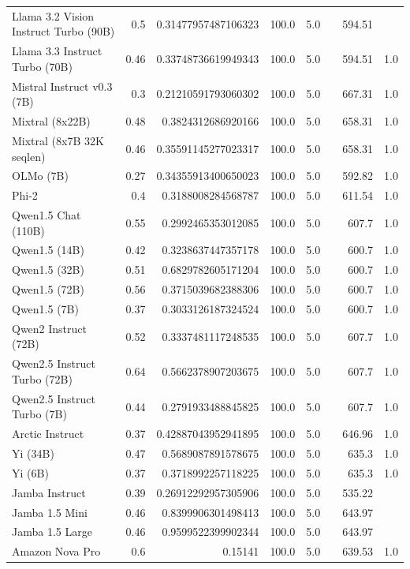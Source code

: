 \begin{table}[htp]
{\begin{tabular}{lrrrrrrr}
Llama 3.2 Vision Instruct Turbo (90B) & 0.5 & 0.31477957487106323 & 100.0 & 5.0 &  & 594.51 &  \\
Llama 3.3 Instruct Turbo (70B) & 0.46 & 0.33748736619949343 & 100.0 & 5.0 &  & 594.51 & 1.0 \\
Mistral Instruct v0.3 (7B) & 0.3 & 0.21210591793060302 & 100.0 & 5.0 &  & 667.31 & 1.0 \\
Mixtral (8x22B) & 0.48 & 0.3824312686920166 & 100.0 & 5.0 &  & 658.31 & 1.0 \\
Mixtral (8x7B 32K seqlen) & 0.46 & 0.35591145277023317 & 100.0 & 5.0 &  & 658.31 & 1.0 \\
OLMo (7B) & 0.27 & 0.34355913400650023 & 100.0 & 5.0 &  & 592.82 & 1.0 \\
Phi-2 & 0.4 & 0.3188008284568787 & 100.0 & 5.0 &  & 611.54 & 1.0 \\
Qwen1.5 Chat (110B) & 0.55 & 0.2992465353012085 & 100.0 & 5.0 &  & 607.7 & 1.0 \\
Qwen1.5 (14B) & 0.42 & 0.3238637447357178 & 100.0 & 5.0 &  & 600.7 & 1.0 \\
Qwen1.5 (32B) & 0.51 & 0.6829782605171204 & 100.0 & 5.0 &  & 600.7 & 1.0 \\
Qwen1.5 (72B) & 0.56 & 0.3715039682388306 & 100.0 & 5.0 &  & 600.7 & 1.0 \\
Qwen1.5 (7B) & 0.37 & 0.3033126187324524 & 100.0 & 5.0 &  & 600.7 & 1.0 \\
Qwen2 Instruct (72B) & 0.52 & 0.3337481117248535 & 100.0 & 5.0 &  & 607.7 & 1.0 \\
Qwen2.5 Instruct Turbo (72B) & 0.64 & 0.5662378907203675 & 100.0 & 5.0 &  & 607.7 & 1.0 \\
Qwen2.5 Instruct Turbo (7B) & 0.44 & 0.2791933488845825 & 100.0 & 5.0 &  & 607.7 & 1.0 \\
Arctic Instruct & 0.37 & 0.42887043952941895 & 100.0 & 5.0 &  & 646.96 & 1.0 \\
Yi (34B) & 0.47 & 0.5689087891578675 & 100.0 & 5.0 &  & 635.3 & 1.0 \\
Yi (6B) & 0.37 & 0.3718992257118225 & 100.0 & 5.0 &  & 635.3 & 1.0 \\
Jamba Instruct & 0.39 & 0.26912292957305906 & 100.0 & 5.0 &  & 535.22 &  \\
Jamba 1.5 Mini & 0.46 & 0.8399906301498413 & 100.0 & 5.0 &  & 643.97 &  \\
Jamba 1.5 Large & 0.46 & 0.9599522399902344 & 100.0 & 5.0 &  & 643.97 &  \\
Amazon Nova Pro & 0.6 & 0.15141 & 100.0 & 5.0 &  & 639.53 & 1.0 \\

\end{tabular}}
\end{table}
